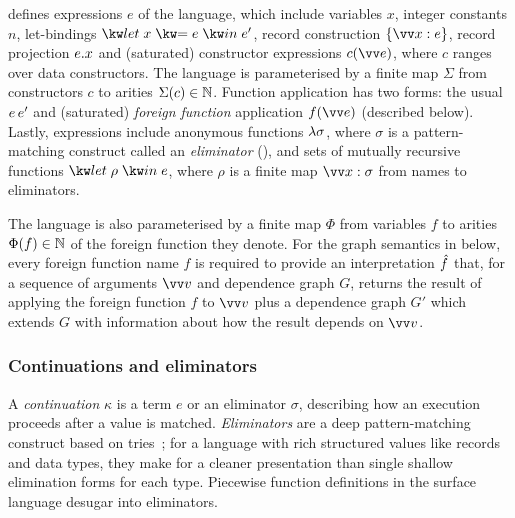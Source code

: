  defines expressions $e$ of the language, which include variables $x$, integer constants $n$,
let-bindings $\exLet{x}{e}{e'}$, record construction $\exRec{\seq{\bind{x}{e}}}$, record projection
$e.x$ and (saturated) constructor expressions $\exConstr{c}{\seq{e}}$, where $c$ ranges over data
constructors. The language is parameterised by a finite map $\Sigma$ from constructors $c$ to arities
$\Sigma(c) \in \mathbb{N}$. Function application has two forms: the usual ${e}\,{e'}$ and (saturated)
\emph{foreign function} application $\exForeignApp{f}{\seq{e}}$ (described below). Lastly, expressions include
anonymous functions $\lambda{\sigma}$, where $\sigma$ is a pattern-matching construct called an
\emph{eliminator} (), and sets of mutually recursive functions
$\exLetRecElim{\rho}{e}$, where $\rho$ is a finite map $\seq{\bind{x}{\sigma}}$ from names to eliminators.


The language is also parameterised by a finite map $\Phi$ from variables $f$ to arities $\Phi(f) \in \mathbb{N}$ of
the foreign function they denote. For the graph semantics in  below, every foreign
function name $f$ is required to provide an interpretation $\hat{f}$ that, for a sequence of arguments
$\seq{v}$ and dependence graph $G$, returns the result of applying the foreign function $f$ to $\seq{v}$ plus
a dependence graph $G'$ which extends $G$ with information about how the result depends on $\seq{v}$.

\subsubsection{Continuations and eliminators}
\label{sec:core:continuations}

A \emph{continuation} $\kappa$ is a term $e$ or an eliminator $\sigma$, describing how an execution proceeds
after a value is matched. \emph{Eliminators} are a deep pattern-matching construct based on
tries~\cite{hinze00,peytonjones2021}; for a language with rich structured values like records and data types,
they make for a cleaner presentation than single shallow elimination forms for each type. Piecewise function
definitions in the surface language desugar into eliminators.

